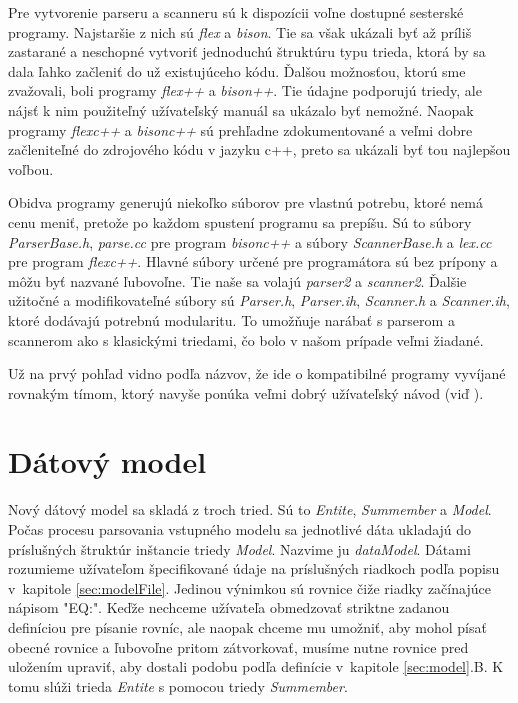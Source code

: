 \documentclass[11pt,final,oneside]{fithesis}
\begin{document}
Pre vytvorenie parseru a scanneru s\'u k dispoz\'icii vo\v lne dostupn\'e sestersk\'e programy. Najstar\v sie z nich s\'u {\it flex} a {\it bison}. Tie sa v\v sak uk\'azali by\v t
a\v z pr\'ili\v s zastaran\'e a neschopn\'e vytvori\v t jednoduch\'u \v strukt\'uru typu trieda, ktor\'a by sa dala \v lahko za\v cleni\v t do u\v z 
existuj\'uceho k\'odu. \v Dal\v sou mo\v znos\v tou, ktor\'u sme zva\v zovali, boli programy {\it flex++} a {\it bison++}. Tie \'udajne podporuj\'u triedy, 
ale n\'ajs\v t k nim pou\v zite\v ln\'y u\v z\'ivate\v lsk\'y manu\'al sa uk\'azalo by\v t nemo\v zn\'e. Naopak programy {\it flexc++} a 
{\it bisonc++} s\'u preh\v ladne zdokumentovan\'e a ve\v lmi dobre za\v clenite\v ln\'e do zdrojov\'eho k\'odu v jazyku c++, preto sa 
uk\'azali by\v t tou najlep\v sou vo\v lbou.

Obidva programy generuj\'u nieko\v lko s\'uborov pre vlastn\'u potrebu, ktor\'e nem\'a cenu meni\v t, preto\v ze po ka\v zdom spusten\'i programu sa 
prep\'i\v su. S\'u to s\'ubory {\it ParserBase.h}, {\it parse.cc} pre program {\it bisonc++} a s\'ubory {\it ScannerBase.h} a {\it lex.cc} pre program 
{\it flexc++}. Hlavn\'e s\'ubory ur\v cen\'e pre program\'atora s\'u bez pr\'ipony a m\^ o\v zu by\v t nazvan\'e \v lubovo\v lne. Tie na\v se sa volaj\'u 
{\it parser2} a {\it scanner2}. \v Dal\v sie u\v zito\v cn\'e a modifikovate\v ln\'e s\'ubory s\'u {\it Parser.h}, {\it Parser.ih}, {\it Scanner.h} a 
{\it Scanner.ih}, ktor\'e dod\'avaj\'u potrebn\'u modularitu. To umo\v z\v nuje nar\'aba\v t s parserom a scannerom ako s klasick\'ymi triedami, \v co 
bolo v na\v som pr\'ipade ve\v lmi \v ziadan\'e. 

U\v z na prv\'y poh\v lad vidno pod\v la n\'azvov, \v ze ide o kompatibiln\'e programy vyv\'ijan\'e rovnak\'ym t\'imom, ktor\'y navy\v se pon\'uka ve\v lmi 
dobr\'y u\v z\'ivate\v lsk\'y n\'avod (vi\v d \cite{flexc++} \cite{bisonc++}).

\section{D\'atov\'y model}
\label{sec:dataModel}
Nov\'y d\'atov\'y model sa sklad\'a z troch tried. S\'u to {\it Entite}, {\it Summember} a {\it Model}. Po\v cas procesu parsovania vstupn\'eho modelu sa 
jednotliv\'e 
d\'ata ukladaj\'u do pr\'islu\v sn\'ych \v strukt\'ur in\v stancie triedy {\it Model}. Nazvime ju {\it dataModel}. D\'atami rozumieme u\v z\'ivate\v lom 
\v specifikovan\'e \'udaje na pr\'islu\v sn\'ych riadkoch pod\v la popisu v~kapitole \ref{sec:modelFile}. Jedinou v\'ynimkou s\'u rovnice \v ci\v ze riadky 
za\v c\'inaj\'uce n\'apisom "{EQ:}". Ke\v d\v ze nechceme u\v z\'ivate\v la obmedzova\v t striktne zadanou defin\'iciou pre p\'isanie rovn\'ic, ale naopak 
chceme mu umo\v zni\v t, aby mohol p\'isa\v t obecn\'e rovnice a \v lubovo\v lne pritom z\'atvorkova\v t, mus\'ime nutne rovnice pred ulo\v zen\'im upravi\v t, 
aby dostali podobu pod\v la defin\'icie v~kapitole \ref{sec:model}.B. K tomu sl\'u\v zi trieda {\it Entite} s pomocou triedy {\it Summember}.
\end{document}
